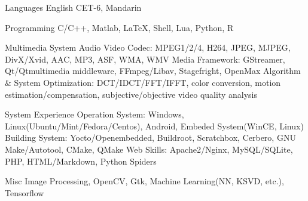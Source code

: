 
\begin{cvskills}
  \cvskill
    {Languages} %
    {English CET-6, Mandarin} %

  \cvskill
    {Programming} %
    {C/C++, Matlab, LaTeX, Shell, Lua, Python, R} %

  \cvskill
    {Multimedia System} %
    {Audio Video Codec: MPEG1/2/4, H264, JPEG, MJPEG, DivX/Xvid, AAC, MP3, ASF, WMA, WMV \newline
    Media Framework: GStreamer, Qt/Qtmultimedia middleware, FFmpeg/Libav, Stagefright, OpenMax \newline
    Algorithm \& System Optimization: DCT/IDCT/FFT/IFFT, color conversion, \newline motion estimation/compensation, subjective/objective video quality analysis} %

  \cvskill
    {System Experience} %
    {Operation System: Windows, Linux(Ubuntu/Mint/Fedora/Centos), Android, \newline
    Embeded System(WinCE, Linux) \newline
    Building System: Yocto/Openembedded, Buildroot, Scratchbox, Cerbero, \newline
    GNU Make/Autotool, CMake, QMake \newline
    Web Skills: Apache2/Nginx, MySQL/SQLite, PHP, HTML/Markdown, Python Spiders} %

  \cvskill
    {Misc} %
    {Image Processing, OpenCV, Gtk, Machine Learning(NN, KSVD, etc.), Tensorflow}

\end{cvskills}
